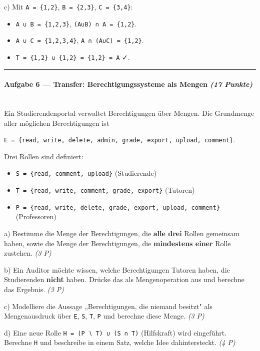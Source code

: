\documentclass[11pt, a4paper]{article}
\begin{document}
c) Mit \texttt{A = \{1,2\}}, \texttt{B = \{2,3\}}, \texttt{C = \{3,4\}}:

\begin{itemize}
  \item \texttt{A ∪ B = \{1,2,3\}}, \texttt{(A∪B) ∩ A = \{1,2\}}.
  \item \texttt{A ∪ C = \{1,2,3,4\}}, \texttt{A ∩ (A∪C) = \{1,2\}}.
  \item \texttt{T = \{1,2\} ∪ \{1,2\} = \{1,2\} = A} ✓.
\end{itemize}


\noindent\textcolor{rulegray}{\rule{\linewidth}{0.4pt}}


\paragraph{Aufgabe 6 — Transfer: Berechtigungssysteme als Mengen \textit{(17 Punkte)}}\mbox{}\\[2pt]

Ein Studierendenportal verwaltet Berechtigungen über Mengen. Die Grundmenge aller möglichen Berechtigungen ist


\texttt{E = \{read, write, delete, admin, grade, export, upload, comment\}}.


Drei Rollen sind definiert:


\begin{itemize}
  \item \texttt{S = \{read, comment, upload\}}            (Studierende)
  \item \texttt{T = \{read, write, comment, grade, export\}} (Tutoren)
  \item \texttt{P = \{read, write, delete, grade, export, upload, comment\}} (Professoren)
\end{itemize}

a) Bestimme die Menge der Berechtigungen, die \textbf{alle drei} Rollen gemeinsam haben, sowie die Menge der Berechtigungen, die \textbf{mindestens einer} Rolle zustehen. \textit{(3 P)}


b) Ein Auditor möchte wissen, welche Berechtigungen Tutoren haben, die Studierenden \textbf{nicht} haben. Drücke das als Mengenoperation aus und berechne das Ergebnis. \textit{(3 P)}


c) Modelliere die Aussage „Berechtigungen, die niemand besitzt" als Mengenausdruck über \texttt{E}, \texttt{S}, \texttt{T}, \texttt{P} und berechne diese Menge. \textit{(3 P)}


d) Eine neue Rolle \texttt{H = (P ∖ T) ∪ (S ∩ T)} (Hilfskraft) wird eingeführt. Berechne \texttt{H} und beschreibe in einem Satz, welche Idee dahintersteckt. \textit{(4 P)}
\end{document}

